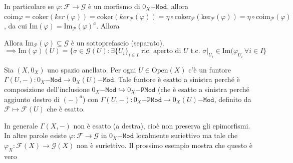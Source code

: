 In particolare se \(\varphi : \mathcal{F} \to \mathcal{G}\) è un morfismo di
\(0_X\mathtt{-Mod}\), allora \(\mathrm{coim}\varphi =
\mathrm{coker}{(ker{(\varphi )})} = \mathrm{coker}{(ker_\mathcal{P}{(\varphi
)})} = \eta \circ \mathrm{coker}_\mathcal{P}{(\mathrm{ker}_\mathcal{P}{(\varphi
)})} = \eta \circ \mathrm{coim}_\mathcal{P}{(\varphi )}\), da cui
\(\mathrm{Im}{(\varphi )} = \mathrm{Im}_\mathcal{P}{(\varphi )}^{a}\). Allora

Allora \(\mathrm{Im}_\mathcal{P}{(\varphi )} \subseteq \mathcal{G} \) è un
sottoprefascio (separato).
\[
  \implies \mathrm{Im}{(\varphi )}{(U)} = \{\sigma \in \mathcal{G }{(U)} :
  \exists \{U_{i}\} _{i \in I} \text{ ric. aperto di \(U\) t.c. }\sigma|_{U_{i}}
\in \mathrm{Im}{(\varphi_{U_{i}}} \, \forall i \in I\} 
\]

Sia \({(X, 0_X)}\) uno spazio anellato. Per ogni \(U \in \mathrm{Open}{(X)}\)
c'è un funtore \(\Gamma{(U, -)} : 0_X\mathtt{-Mod} \to 0_X{(U)}\mathtt{-Mod}\).
Tale funtore è esatto a sinistra perché è composizione dell'inclusione
\(0_X\mathtt{-Mod} \hookrightarrow 0_X\mathtt{-PMod}\) (che è esatto a sinistra
perché aggiunto destro di \({(-)}^{a}\)) con \(\Gamma{(U, -)}:
0_X\mathtt{-PMod} \to 0_X{(U)}\mathtt{-Mod}\), definito da \(\mathcal{F} \mapsto
\mathcal{F}{(U)}\) che è esatto.

\begin{remark}{}
    In generale \(\Gamma{(X, -)}\) non è esatto (a destra), cioè non preserva
    gli epimorfismi. In altre parole esiste \(\varphi  : \mathcal{F} \to
    \mathcal{G}\) in \(0_X\mathtt{-Mod}\) localmente suriettivo ma tale che
    \(\varphi _X : \mathcal{F}{(X)} \to \mathcal{G}{(X)}\) non è suriettivo.
    Il prossimo esempio mostra che questo è vero
\end{remark}

